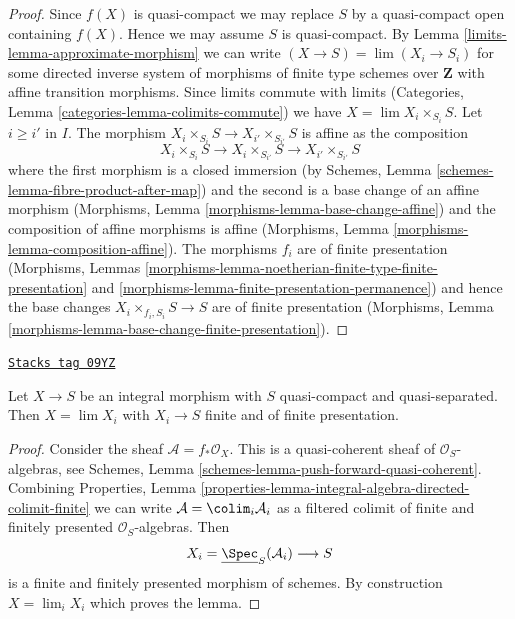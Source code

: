 \begin{proof}

Since $f(X)$ is quasi-compact we may replace $S$ by a quasi-compact
open containing $f(X)$. Hence we may assume $S$ is quasi-compact.
By Lemma \ref{limits-lemma-approximate-morphism} we can write
$(X \to S) = \lim (X_i \to S_i)$ for some directed inverse system
of morphisms of finite type schemes over $\mathbf{Z}$ with
affine transition morphisms. Since limits commute with limits
(Categories, Lemma \ref{categories-lemma-colimits-commute})
we have $X = \lim X_i \times_{S_i} S$.
Let $i \geq i'$ in $I$. The morphism
$X_i \times_{S_i} S \to X_{i'} \times_{S_{i'}} S$
is affine as the composition
$$
X_i \times_{S_i} S \to X_i \times_{S_{i'}} S \to X_{i'} \times_{S_{i'}} S
$$
where the first morphism is a closed immersion (by
Schemes, Lemma \ref{schemes-lemma-fibre-product-after-map})
and the second is a base change of an affine morphism
(Morphisms, Lemma \ref{morphisms-lemma-base-change-affine})
and the composition of affine morphisms is affine
(Morphisms, Lemma \ref{morphisms-lemma-composition-affine}).
The morphisms $f_i$ are of finite presentation
(Morphisms, Lemmas
\ref{morphisms-lemma-noetherian-finite-type-finite-presentation} and
\ref{morphisms-lemma-finite-presentation-permanence})
and hence the base changes $X_i \times_{f_i, S_i} S \to S$
are of finite presentation
(Morphisms, Lemma \ref{morphisms-lemma-base-change-finite-presentation}).
\end{proof}

\begin{lemma}
\label{limits-lemma-integral-limit-finite-and-finite-presentation}
\href{https://stacks.math.columbia.edu/tag/09YZ}{\texttt{Stacks tag 09YZ}}

Let $X \to S$ be an integral morphism with $S$ quasi-compact and
quasi-separated. Then $X = \lim X_i$ with $X_i \to S$ finite and
of finite presentation.
\end{lemma}

\begin{proof}
Consider the sheaf $\mathcal{A} = f_*\mathcal{O}_X$.
This is a quasi-coherent sheaf of $\mathcal{O}_S$-algebras, see
Schemes, Lemma \ref{schemes-lemma-push-forward-quasi-coherent}.
Combining
Properties, Lemma
\ref{properties-lemma-integral-algebra-directed-colimit-finite}
we can write $\mathcal{A} = \colim_i \mathcal{A}_i$ as a filtered
colimit of finite and finitely presented $\mathcal{O}_S$-algebras.
Then
$$
X_i = \underline{\Spec}_S(\mathcal{A}_i)
\longrightarrow
S
$$
is a finite and finitely presented morphism of schemes. By construction
$X = \lim_i X_i$ which proves the lemma.
\end{proof}

